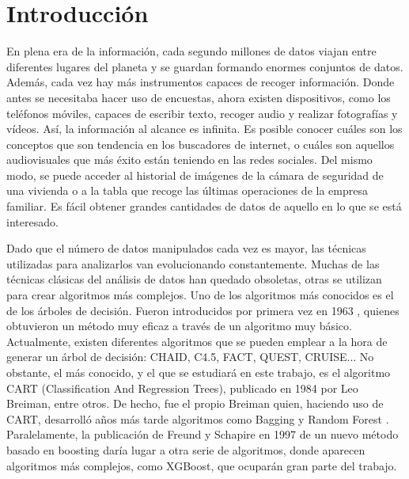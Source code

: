 \documentclass[12pt,twoside]{article}
\begin{document}
\newpage



\tableofcontents



\newpage



\section{Introducción}

En plena era de la información, cada segundo millones de datos viajan entre diferentes lugares del planeta y se guardan formando enormes conjuntos de datos. Además, cada vez hay más instrumentos capaces de recoger información. Donde antes se necesitaba hacer uso de encuestas, ahora existen dispositivos, como los teléfonos móviles, capaces de escribir texto, recoger audio y realizar fotografías y vídeos. Así, la información al alcance es infinita. Es posible conocer cuáles son los conceptos que son tendencia en los buscadores de internet, o cuáles son aquellos audiovisuales que más éxito están teniendo en las redes sociales. Del mismo modo, se  puede acceder al historial de imágenes de la cámara de seguridad de una vivienda o a la tabla que recoge las últimas operaciones de la empresa familiar. Es fácil obtener grandes cantidades de datos de aquello en lo que se está interesado.

Dado que el número de datos manipulados cada vez es mayor, las técnicas utilizadas para analizarlos van evolucionando constantemente. Muchas de las técnicas clásicas del análisis de datos han quedado obsoletas, otras se utilizan para crear algoritmos más complejos. Uno de los algoritmos más conocidos es el de los árboles de decisión. Fueron introducidos por primera vez en 1963 \cite{MO01}, quienes obtuvieron un método muy eficaz a través de un algoritmo muy básico. Actualmente, existen diferentes algoritmos que se pueden emplear a la hora de generar un árbol de decisión: CHAID, C4.5, FACT, QUEST, CRUISE... No obstante, el más conocido, y el que se estudiará en este trabajo, es el algoritmo CART (Classification And Regression Trees), publicado en 1984 \cite{BR03} por Leo Breiman, entre otros. De hecho, fue el propio Breiman quien, haciendo uso de CART, desarrolló años más tarde algoritmos como Bagging \cite{BR01} y Random Forest \cite{BR02}. Paralelamente, la publicación de Freund y Schapire en 1997 \cite{FR01} de un nuevo método basado en boosting daría lugar a otra serie de algoritmos, donde aparecen algoritmos más complejos, como XGBoost, que ocuparán gran parte del trabajo.
\end{document}
